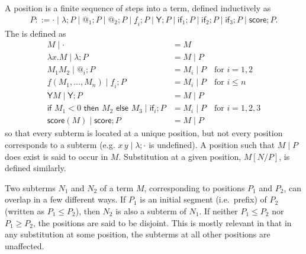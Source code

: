 \documentclass{article}
\newcommand{\tY}{\textsf{Y}}
\newcommand{\tif}[3]{\textsf{if }#1\textsf{ then }#2\textsf{ else }#3}
\newcommand{\tscore}{\textsf{score}}
\theoremstyle{definition}
\theoremstyle{lemma}
\theoremstyle{remark}
\begin{document}
A position  is a finite sequence of steps into a term, defined inductively as
\begin{align*}
P ::= \cdot \mid \lambda ; P \mid @_1 ; P \mid @_2 ; P \mid \underline f_i ; P \mid \tY ; P \mid \textsf{if}_1 ; P \mid \textsf{if}_2 ; P \mid \textsf{if}_3 ; P \mid \tscore ; P.
\end{align*}
The  is defined as
\begin{align*}
M \mid \cdot & = M \\
\lambda x. M \mid \lambda ; P & = M \mid P \\
M_1 M_2 \mid @_i ; P & = M_i \mid P \quad \text{for } i = 1,2 \\
\underline f(M_1,\dots,M_n) \mid \underline f_i ; P & = M_i \mid P \quad \text{for }i \leq n \\
\tY M \mid \tY ; P & = M \mid P \\
\tif{M_1 < 0}{M_2}{M_3} \mid \textsf{if}_i ; P & = M_i \mid P \quad \text{for } i = 1,2,3 \\
\tscore(M) \mid \tscore ; P & = M \mid P
\end{align*}
so that every subterm is located at a unique position, but not every position corresponds to a subterm (e.g. $x \, y \mid \lambda ; \cdot$ is undefined). A position such that $M\mid P$ does exist is said to occur in $M$. Substitution at a given position, $M[N/P]$, is defined similarly.

Two subterms $N_1$ and $N_2$ of a term $M$, corresponding to positions $P_1$ and $P_2$, can overlap in a few different ways. If $P_1$ is an initial segment (i.e.~prefix) of $P_2$ (written as $P_1 \leq P_2$), then $N_2$ is also a subterm of $N_1$. If neither $P_1 \leq P_2$ nor $P_1 \geq P_2$, the positions are said to be disjoint. This is mostly relevant in that in any substitution at some position, the subterms at all other positions are unaffected.
\end{document}
